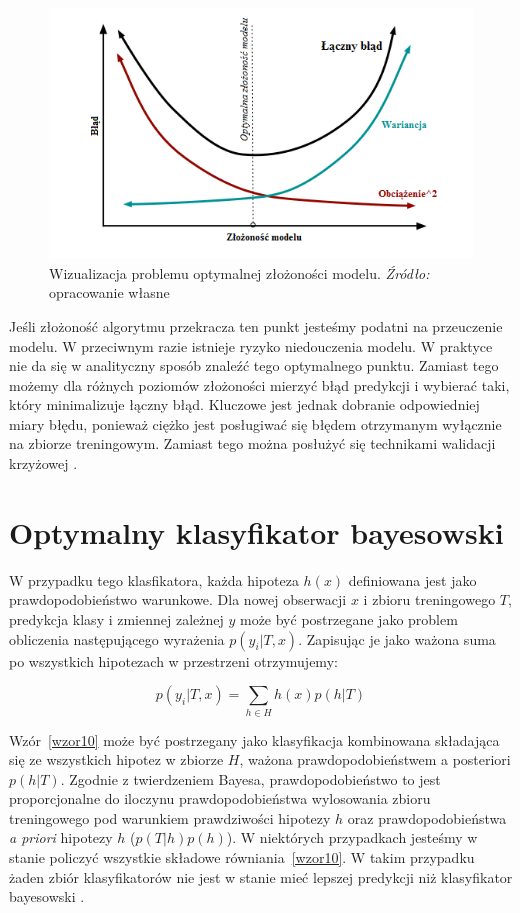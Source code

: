 \documentclass[12pt,a4paper,twoside,openany]{book}
\begin{document}
\begin{figure}
\centering
\includegraphics[scale=0.95]{./rys006}
\caption{Wizualizacja problemu optymalnej złożoności modelu. \textit{Źródło:} opracowanie własne}\label{rys006}
\end{figure}

Jeśli złożoność algorytmu przekracza ten punkt jesteśmy podatni na przeuczenie modelu. W przeciwnym razie istnieje ryzyko niedouczenia modelu. W praktyce nie da się w analityczny sposób znaleźć tego optymalnego punktu. Zamiast tego możemy dla różnych poziomów złożoności mierzyć błąd predykcji i wybierać taki, który minimalizuje łączny błąd. Kluczowe jest jednak dobranie odpowiedniej miary błędu, ponieważ ciężko jest posługiwać się błędem otrzymanym wyłącznie na zbiorze treningowym. Zamiast tego można posłużyć się technikami walidacji krzyżowej \citep{kohavi1995}.


\section{Optymalny klasyfikator bayesowski}

W przypadku tego klasfikatora, każda hipoteza $h(x)$ definiowana jest jako prawdopodobieństwo warunkowe. Dla nowej obserwacji $x$ i zbioru treningowego $T$, predykcja klasy i zmiennej zależnej $y$ może być postrzegane jako problem obliczenia następującego wyrażenia $p(y_i |T, x)$. Zapisując je jako ważona suma po wszystkich hipotezach w przestrzeni otrzymujemy:

\begin{equation} \label{wzor10}
p(y_i|T, x) = \sum_{h \in H} h(x)p(h| T)
\end{equation}


Wzór~\ref{wzor10} może być postrzegany jako klasyfikacja kombinowana składająca się ze wszystkich hipotez w zbiorze $H$, ważona prawdopodobieństwem a posteriori $p(h| T)$. Zgodnie z twierdzeniem Bayesa, prawdopodobieństwo to jest proporcjonalne do iloczynu prawdopodobieństwa wylosowania zbioru treningowego pod warunkiem prawdziwości hipotezy $h$  oraz prawdopodobieństwa \textit{a priori} hipotezy $h$ ($p(T| h)p(h)$). W niektórych przypadkach jesteśmy w stanie policzyć wszystkie składowe równiania~\ref{wzor10}. W takim przypadku żaden zbiór klasyfikatorów nie jest w stanie mieć lepszej predykcji niż klasyfikator bayesowski \citep{mitchell1977,hastie2009}.
\end{document}
